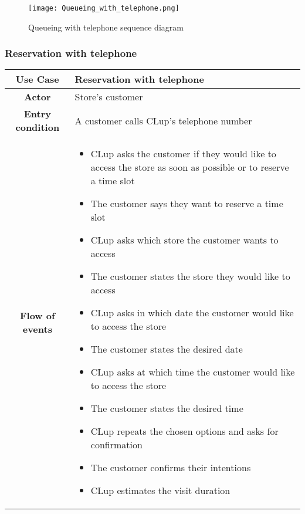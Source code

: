 \documentclass[../../main.tex]{subfiles}
\begin{document}
      \begin{figure}[H]
        \centering
        \texttt{[image: Queueing\_with\_telephone.png]}
        \caption{Queueing with telephone sequence diagram}
      \end{figure}


      \subsubsection{Reservation with telephone}

      \begin{table}[H]
        \centering
          \begin{tabular}{c m{}}
          \hline
          \textbf{Use Case} & Reservation with telephone\\ \hline
          \textbf{Actor} & Store's customer\\ \hline
          \textbf{Entry condition} & A customer calls CLup's telephone number\\  \hline
          \textbf{Flow of events} & \begin{itemize}
                                      \item CLup asks the customer if they would like to access the store as soon as possible or to reserve a time slot
                                      \item The customer says they want to reserve a time slot
                                      \item CLup asks which store the customer wants to access
                                      \item The customer states the store they would like to access
                                      \item CLup asks in which date the customer would like to access the store
                                      \item The customer states the desired date
                                      \item CLup asks at which time the customer would like to access the store
                                      \item The customer states the desired time
                                      \item CLup repeats the chosen options and asks for confirmation
                                      \item The customer confirms their intentions
                                      \item CLup estimates the visit duration

\end{itemize}
\end{tabular}
\end{table}
\end{document}
